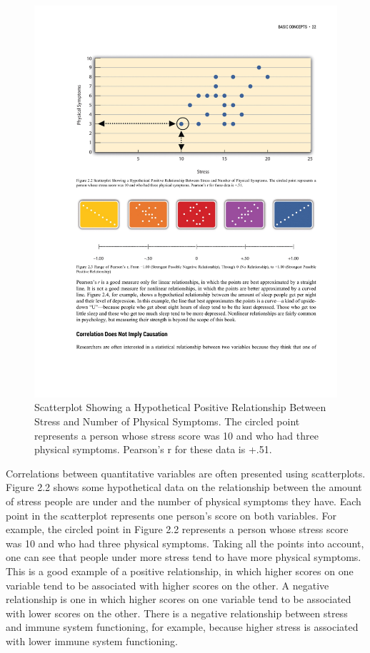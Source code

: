 \begin{figure}
      \includegraphics[width=.75\linewidth]{figures/C2F3Correlation.pdf}
      \caption{Scatterplot Showing a Hypothetical Positive Relationship Between Stress and Number of Physical Symptoms. The circled point represents a person whose stress score was 10 and who had three physical symptoms. Pearson’s r for these data is +.51.}
      \label{fig:Correlation}
\end{figure}


 Correlations between quantitative variables are often presented using scatterplots. Figure 2.2 shows some hypothetical data on the relationship between the amount of stress people are under and the number of physical symptoms they have. Each point in the scatterplot represents one person's score on both variables. For example, the circled point in Figure 2.2 represents a person whose stress score was 10 and who had three physical symptoms. Taking all the points into account, one can see that people under more stress tend to have more physical symptoms. This is a good example of a positive relationship, in which higher scores on one variable tend to be associated with higher scores on the other. A negative relationship is one in which higher scores on one variable tend to be associated with lower scores on the other. There is a negative relationship between stress and immune system functioning, for example, because higher stress is associated with lower immune system functioning.

